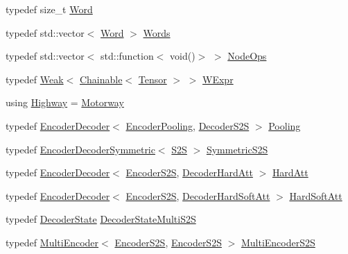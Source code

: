 \begin{DoxyCompactItemize}
typedef size\+\_\+t \hyperlink{namespacemarian_a5db8bee455c97a62d6a525dc48efe4c2}{Word}
\item 
typedef std\+::vector$<$ \hyperlink{namespacemarian_a5db8bee455c97a62d6a525dc48efe4c2}{Word} $>$ \hyperlink{namespacemarian_a5385eef6e49dd8f789f616ef579dea3f}{Words}
\item 
typedef std\+::vector$<$ std\+::function$<$ void()$>$ $>$ \hyperlink{namespacemarian_a4956376218cc236016c20bc4071470da}{Node\+Ops}
\item 
typedef \hyperlink{namespacemarian_acde6307b95538fbf82548c2e1108ccf4}{Weak}$<$ \hyperlink{classmarian_1_1Chainable}{Chainable}$<$ \hyperlink{namespacemarian_a88b71ec34bb354564cddc24eb80f7e14}{Tensor} $>$ $>$ \hyperlink{namespacemarian_a2b926a792e343705a2eb5224771f47de}{W\+Expr}
\item 
using \hyperlink{namespacemarian_a7d8e9572693ffcfd9836ee46cd4b81ce}{Highway} = \hyperlink{classmarian_1_1Motorway}{Motorway}
\item 
typedef \hyperlink{classmarian_1_1EncoderDecoder}{Encoder\+Decoder}$<$ \hyperlink{classmarian_1_1EncoderPooling}{Encoder\+Pooling}, \hyperlink{classmarian_1_1DecoderS2S}{Decoder\+S2S} $>$ \hyperlink{namespacemarian_a9c309a030b3dc0b8fad7dfa3d584c3c1}{Pooling}
\item 
typedef \hyperlink{classmarian_1_1EncoderDecoderSymmetric}{Encoder\+Decoder\+Symmetric}$<$ \hyperlink{namespacemarian_a83eeb152f60aff415a60e0bde62fcb85}{S2S} $>$ \hyperlink{namespacemarian_a48b010253fa71c5bcb6f5016662d5ff6}{Symmetric\+S2S}
\item 
typedef \hyperlink{classmarian_1_1EncoderDecoder}{Encoder\+Decoder}$<$ \hyperlink{classmarian_1_1EncoderS2S}{Encoder\+S2S}, \hyperlink{classmarian_1_1DecoderHardAtt}{Decoder\+Hard\+Att} $>$ \hyperlink{namespacemarian_a8c218ad930486503729d954880f0b29d}{Hard\+Att}
\item 
typedef \hyperlink{classmarian_1_1EncoderDecoder}{Encoder\+Decoder}$<$ \hyperlink{classmarian_1_1EncoderS2S}{Encoder\+S2S}, \hyperlink{classmarian_1_1DecoderHardSoftAtt}{Decoder\+Hard\+Soft\+Att} $>$ \hyperlink{namespacemarian_a510c9e6926b0b3808cea5dff79e8d984}{Hard\+Soft\+Att}
\item 
typedef \hyperlink{classmarian_1_1DecoderState}{Decoder\+State} \hyperlink{namespacemarian_a137d04212ba21a89d625a75676d91939}{Decoder\+State\+Multi\+S2S}
\item 
typedef \hyperlink{classmarian_1_1MultiEncoder}{Multi\+Encoder}$<$ \hyperlink{classmarian_1_1EncoderS2S}{Encoder\+S2S}, \hyperlink{classmarian_1_1EncoderS2S}{Encoder\+S2S} $>$ \hyperlink{namespacemarian_ae5c33c87d5d69701dccd48b503ec7d6a}{Multi\+Encoder\+S2S}

\end{DoxyCompactItemize}
